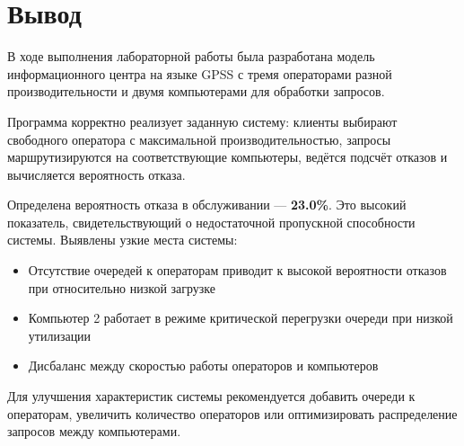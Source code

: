 \section{Вывод}

В ходе выполнения лабораторной работы была разработана модель информационного центра на языке GPSS с тремя операторами разной производительности и двумя компьютерами для обработки запросов.

Программа корректно реализует заданную систему: клиенты выбирают свободного оператора с максимальной производительностью, запросы маршрутизируются на соответствующие компьютеры, ведётся подсчёт отказов и вычисляется вероятность отказа.

Определена вероятность отказа в обслуживании — \textbf{23.0\%}. Это высокий показатель, свидетельствующий о недостаточной пропускной способности системы. Выявлены узкие места системы:

\begin{itemize}
    \item Отсутствие очередей к операторам приводит к высокой вероятности отказов при относительно низкой загрузке
    \item Компьютер 2 работает в режиме критической перегрузки очереди при низкой утилизации
    \item Дисбаланс между скоростью работы операторов и компьютеров
\end{itemize}

Для улучшения характеристик системы рекомендуется добавить очереди к операторам, увеличить количество операторов или оптимизировать распределение запросов между компьютерами.

